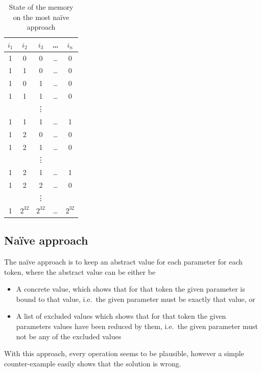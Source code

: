 	\begin{table}
	\caption{State of the memory on the most na\"ive approach}		
	\label{tab:algo:memory}
	\centering
	\begin{tabular}{ccccc}
		\toprule
		$i_1$ &	$i_2$ & $i_3$ & \dots & $i_n$ \\
		\midrule
		1 	  & 0     & 0     & \dots & 0 \\
		1     & 1     & 0     & \dots & 0 \\
		1     & 0     & 1     & \dots & 0 \\ 
		1     & 1     & 1     & \dots & 0 \\ 
		      &       &\vdots &       &   \\
		1     & 1     & 1     & \dots & 1 \\
		1 	  & 2     & 0     & \dots & 0 \\
		1     & 2     & 1     & \dots & 0 \\
	  	      &       &\vdots &       &   \\
		1     & 2     & 1     & \dots & 1 \\ 
		1     & 2     & 2     & \dots & 0 \\ 
		      &       &\vdots &       &   \\
		1     &$2^{32}$ &$2^{32}$ & \dots & $2^{32}$\\
		\bottomrule
	\end{tabular}
	\end{table}
	
	\subsection{Na\"ive approach}	

	The na\"ive approach is to keep an abstract value for each parameter for each token,
	where the abstract value can be either be
	\begin{itemize}
		\item A concrete value, which shows that for that token the given parameter is bound to that value, i.e.~the given parameter must be exactly that value, or
		\item A list of excluded values which shows that for that token the given parameters values have been reduced by them, i.e.~the given parameter must not be any of the excluded values
	\end{itemize}

	With this approach, every operation seems to be plausible, however a simple counter-example easily shows that the solution is wrong.
	
